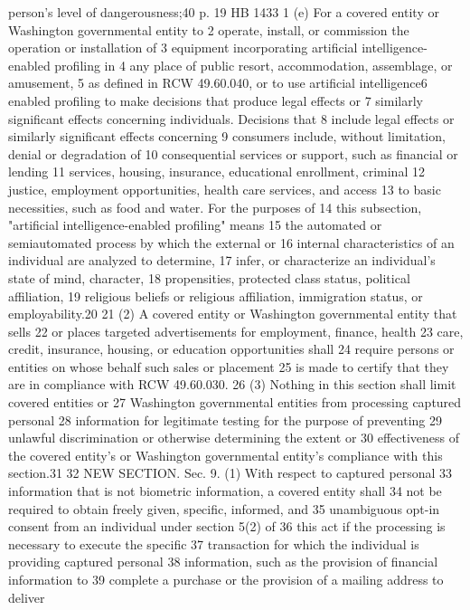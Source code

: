 person's level of dangerousness;40
p. 19 HB 1433
1 (e) For a covered entity or Washington governmental entity to
2 operate, install, or commission the operation or installation of
3 equipment incorporating artificial intelligence-enabled profiling in
4 any place of public resort, accommodation, assemblage, or amusement,
5 as defined in RCW 49.60.040, or to use artificial intelligence6 enabled profiling to make decisions that produce legal effects or
7 similarly significant effects concerning individuals. Decisions that
8 include legal effects or similarly significant effects concerning
9 consumers include, without limitation, denial or degradation of
10 consequential services or support, such as financial or lending
11 services, housing, insurance, educational enrollment, criminal
12 justice, employment opportunities, health care services, and access
13 to basic necessities, such as food and water. For the purposes of
14 this subsection, "artificial intelligence-enabled profiling" means
15 the automated or semiautomated process by which the external or
16 internal characteristics of an individual are analyzed to determine,
17 infer, or characterize an individual's state of mind, character,
18 propensities, protected class status, political affiliation,
19 religious beliefs or religious affiliation, immigration status, or
employability.20
21 (2) A covered entity or Washington governmental entity that sells
22 or places targeted advertisements for employment, finance, health
23 care, credit, insurance, housing, or education opportunities shall
24 require persons or entities on whose behalf such sales or placement
25 is made to certify that they are in compliance with RCW 49.60.030.
26 (3) Nothing in this section shall limit covered entities or
27 Washington governmental entities from processing captured personal
28 information for legitimate testing for the purpose of preventing
29 unlawful discrimination or otherwise determining the extent or
30 effectiveness of the covered entity's or Washington governmental
entity's compliance with this section.31
32 NEW SECTION. Sec. 9. (1) With respect to captured personal
33 information that is not biometric information, a covered entity shall
34 not be required to obtain freely given, specific, informed, and
35 unambiguous opt-in consent from an individual under section 5(2) of
36 this act if the processing is necessary to execute the specific
37 transaction for which the individual is providing captured personal
38 information, such as the provision of financial information to
39 complete a purchase or the provision of a mailing address to deliver
